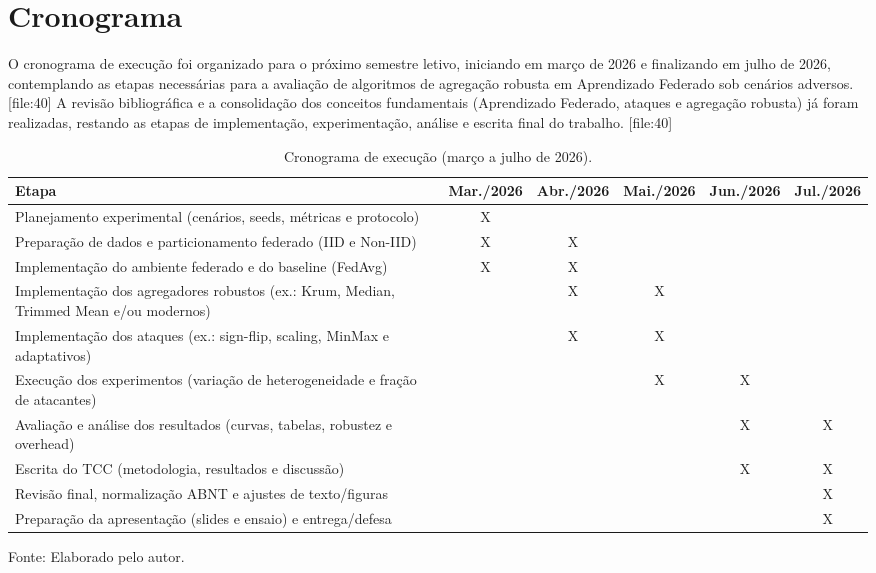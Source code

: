 \chapter{Cronograma}
\label{chap:cronograma}

O cronograma de execução foi organizado para o próximo semestre letivo, iniciando em março de 2026 e finalizando em julho de 2026, contemplando as etapas necessárias para a avaliação de algoritmos de agregação robusta em Aprendizado Federado sob cenários adversos. [file:40]
A revisão bibliográfica e a consolidação dos conceitos fundamentais (Aprendizado Federado, ataques e agregação robusta) já foram realizadas, restando as etapas de implementação, experimentação, análise e escrita final do trabalho. [file:40]

\begin{table}[htbp]
    \centering
    \caption{Cronograma de execução (março a julho de 2026).}
    \label{tab:cronograma}
    \begin{tabular}{|p{8.2cm}|c|c|c|c|c|}
        \hline
        \textbf{Etapa} & \textbf{Mar./2026} & \textbf{Abr./2026} & \textbf{Mai./2026} & \textbf{Jun./2026} & \textbf{Jul./2026} \\
        \hline
        Planejamento experimental (cenários, seeds, métricas e protocolo) & X &  &  &  &  \\
        \hline
        Preparação de dados e particionamento federado (IID e Non-IID) & X & X &  &  &  \\
        \hline
        Implementação do ambiente federado e do baseline (FedAvg) & X & X &  &  &  \\
        \hline
        Implementação dos agregadores robustos (ex.: Krum, Median, Trimmed Mean e/ou modernos) &  & X & X &  &  \\
        \hline
        Implementação dos ataques (ex.: sign-flip, scaling, MinMax e adaptativos) &  & X & X &  &  \\
        \hline
        Execução dos experimentos (variação de heterogeneidade e fração de atacantes) &  &  & X & X &  \\
        \hline
        Avaliação e análise dos resultados (curvas, tabelas, robustez e overhead) &  &  &  & X & X \\
        \hline
        Escrita do TCC (metodologia, resultados e discussão) &  &  &  & X & X \\
        \hline
        Revisão final, normalização ABNT e ajustes de texto/figuras &  &  &  &  & X \\
        \hline
        Preparação da apresentação (slides e ensaio) e entrega/defesa &  &  &  &  & X \\
        \hline
    \end{tabular}

    \vspace{0.3cm}
    {\footnotesize Fonte: Elaborado pelo autor.}
\end{table}

